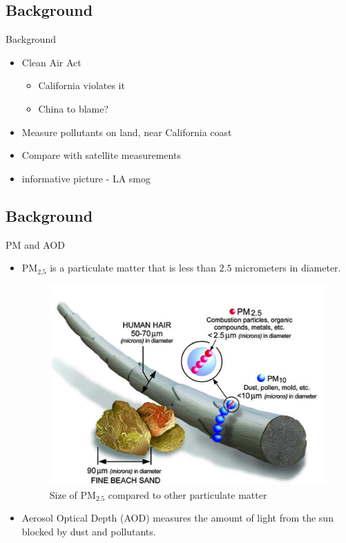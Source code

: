 \subsection*{Background}
\begin{frame}{Background}
\begin{itemize}

\item Clean Air Act
\begin{itemize}
\item California violates it
\item China to blame?
\end{itemize}
\item Measure pollutants on land, near California coast
\item Compare with satellite measurements
\item informative picture - LA smog
\end{itemize}
\end{frame}
\subsection*{Background}
\begin{frame}{PM and AOD}
\begin{itemize}

\item PM$_{2.5}$ is a particulate matter that is less than $2.5$ micrometers in diameter.

\begin{figure}[H]
\centering
\includegraphics[scale=0.35]{hair.png}
\caption{Size of PM$_{2.5}$ compared to other particulate matter}
\label{fig:locations}
\end{figure}


\item Aerosol Optical Depth (AOD) measures the amount of light from the sun blocked by dust and pollutants.

\end{itemize}
\end{frame}

